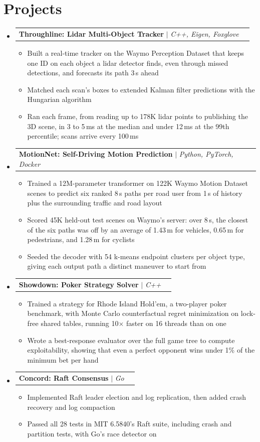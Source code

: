 \documentclass[letterpaper,11pt]{article}
\makeatletter
\newcommand{\resumeItem}[1]{
  \item\small{
    {#1 \vspace{-2pt}}
  }
}
\newcommand{\resumeProjectHeading}[2]{
    \item
    \begin{tabular*}{\linewidth}{l@{\extracolsep{\fill}}r}
      #1 & #2 \\
    \end{tabular*}\vspace{-7pt}
}
\newcommand{\resumeSubHeadingListStart}{\begin{itemize}[leftmargin=0.15in, label={}]}
\newcommand{\resumeSubHeadingListEnd}{\end{itemize}}
\newcommand{\resumeItemListStart}{\begin{itemize}}
\newcommand{\resumeItemListEnd}{\end{itemize}\vspace{-5pt}}
\makeatother
\begin{document}
\section{Projects}
  \resumeSubHeadingListStart
    \resumeProjectHeading
      {\textbf{Throughline: Lidar Multi-Object Tracker} $|$ \emph{C++, Eigen, Foxglove}}{}
      \resumeItemListStart
        \resumeItem{Built a real-time tracker on the Waymo Perception Dataset that keeps one ID on each object a lidar detector finds, even through missed detections, and forecasts its path 3\,s ahead}
        \resumeItem{Matched each scan's boxes to extended Kalman filter predictions with the Hungarian algorithm}
        \resumeItem{Ran each frame, from reading up to 178K lidar points to publishing the 3D scene, in 3 to 5\,ms at the median and under 12\,ms at the 99th percentile; scans arrive every 100\,ms}
      \resumeItemListEnd
    \resumeProjectHeading
      {\textbf{MotionNet: Self-Driving Motion Prediction} $|$ \emph{Python, PyTorch, Docker}}{}
      \resumeItemListStart
        \resumeItem{Trained a 12M-parameter transformer on 122K Waymo Motion Dataset scenes to predict six ranked 8\,s paths per road user from 1\,s of history plus the surrounding traffic and road layout}
        \resumeItem{Scored 45K held-out test scenes on Waymo's server: over 8\,s, the closest of the six paths was off by an average of 1.43\,m for vehicles, 0.65\,m for pedestrians, and 1.28\,m for cyclists}
        \resumeItem{Seeded the decoder with 54 k-means endpoint clusters per object type, giving each output path a distinct maneuver to start from}
      \resumeItemListEnd
    \resumeProjectHeading
      {\textbf{Showdown: Poker Strategy Solver} $|$ \emph{C++}}{}
      \resumeItemListStart
        \resumeItem{Trained a strategy for Rhode Island Hold'em, a two-player poker benchmark, with Monte Carlo counterfactual regret minimization on lock-free shared tables, running 10$\times$ faster on 16 threads than on one}
        \resumeItem{Wrote a best-response evaluator over the full game tree to compute exploitability, showing that even a perfect opponent wins under 1\% of the minimum bet per hand}
      \resumeItemListEnd
    \resumeProjectHeading
      {\textbf{Concord: Raft Consensus} $|$ \emph{Go}}{}
      \resumeItemListStart
        \resumeItem{Implemented Raft leader election and log replication, then added crash recovery and log compaction}
        \resumeItem{Passed all 28 tests in MIT 6.5840's Raft suite, including crash and partition tests, with Go's race detector on}
      \resumeItemListEnd
    \vspace{-4pt}
  \resumeSubHeadingListEnd
\end{document}
